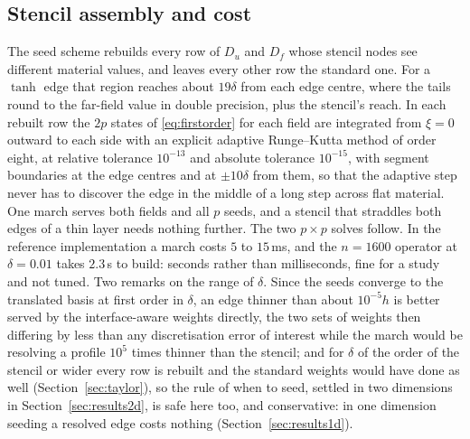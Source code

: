 \documentclass[11pt]{amsart}
\theoremstyle{definition}
\theoremstyle{remark}
\begin{document}
\subsection{Stencil assembly and cost}
\label{sec:assembly1d}
The seed scheme rebuilds every row of $D_u$ and $D_f$ whose stencil
nodes see different material values, and leaves every other row the
standard one. For a $\tanh$ edge that region reaches about $19\delta$
from each edge centre, where the tails round to the far-field value in
double precision, plus the stencil's reach. In each rebuilt row the
$2p$ states of \eqref{eq:firstorder} for each field are integrated from $\xi = 0$
outward to each side with an explicit adaptive Runge--Kutta method of
order eight, at relative tolerance $10^{-13}$ and absolute tolerance
$10^{-15}$, with segment boundaries at the edge centres and at
$\pm 10\delta$ from them, so that the adaptive step never has to
discover the edge in the middle of a long step across flat material.
One march serves both fields and all $p$ seeds, and a stencil that
straddles both edges of a thin layer needs nothing further. The two
$p \times p$ solves follow. In the reference implementation a march
costs $5$ to $15$\,ms, and the $n = 1600$ operator at $\delta = 0.01$
takes $2.3$\,s to build: seconds rather than milliseconds, fine for a
study and not tuned. Two remarks on the range of $\delta$. Since the
seeds converge to the translated basis at first order in $\delta$, an
edge thinner than about $10^{-5} h$ is better served by the
interface-aware weights directly, the two sets of weights then differing
by less than any discretisation error of interest while the march would
be resolving a profile $10^5$ times thinner than the stencil; and for $\delta$ of the order of the stencil or wider
every row is rebuilt and the standard weights would have done as well
(Section~\ref{sec:taylor}), so the rule of when to seed, settled in two
dimensions in Section~\ref{sec:results2d}, is safe here too, and
conservative: in one dimension seeding a resolved edge costs nothing
(Section~\ref{sec:results1d}).

\end{document}
